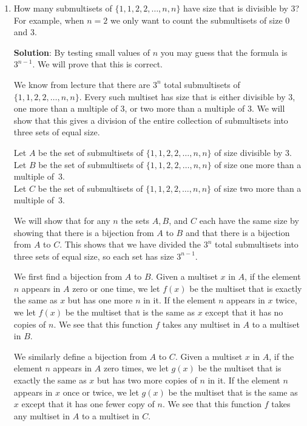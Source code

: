\documentclass[11pt]{article}
\begin{document}
\begin{enumerate}
\begin{enumerate}
{\bf Solution}: We must choose a team of $3$ centers, $4$ guards, and $5$ forwards, out of a total pool of $3\cdot 15 = 45$ centers, $4\cdot 15 = 60$ guards, and $5\cdot 15 = 75$ forwards.  The number of ways of doing this is $\binom{45}{3}\cdot \binom{60}{4} \cdot \binom{75}{5}$.

\end{enumerate}

\item How many submultisets of $\{1,1,2,2,\ldots, n, n\}$ have size that is divisible by $3$?  \\
For example, when $n = 2$ we only want to count the submultisets of size $0$ and $3$.

{\bf Solution}: By testing small values of $n$ you may guess that the formula is $3^{n-1}$.  We will prove that this is correct.

We know from lecture that there are $3^n$ total submultisets of $\{1,1,2,2,\ldots, n, n\}$.  Every such multiset has size that is either divisible by $3$, one more than a multiple of $3$, or two more than a multiple of $3$.  We will show that this gives a division of the entire collection of submultisets into three sets of equal size.  

Let $A$ be the set of submultisets of $\{1,1,2,2,\ldots,n,n\}$ of size divisible by $3$.\\
Let $B$ be the set of submultisets of $\{1,1,2,2,\ldots,n,n\}$ of size one more than a multiple of~$3$.\\
Let $C$ be the set of submultisets of $\{1,1,2,2,\ldots,n,n\}$ of size two more than a multiple of~$3$.

We will show that for any $n$ the sets $A,B$, and $C$ each have the same size by showing that there is a bijection from $A$ to $B$ and that there is a bijection from $A$ to $C$.  This shows that we have divided the $3^n$ total submultisets into three sets of equal size, so each set has size $3^{n-1}$.

We first find a bijection from $A$ to $B$.  Given a multiset $x$ in $A$, if the element $n$ appears in $A$ zero or one time, we let $f(x)$ be the multiset that is exactly the same as $x$ but has one more $n$ in it.  If the element $n$ appears in $x$ twice, we let $f(x)$ be the multiset that is the same as $x$ except that it has no copies of $n$.  We see that this function $f$ takes any multiset in $A$ to a multiset in $B$.

We similarly define a bijection from $A$ to $C$. Given a multiset $x$ in $A$, if the element $n$ appears in $A$ zero times, we let $g(x)$ be the multiset that is exactly the same as $x$ but has two more copies of $n$ in it.  If the element $n$ appears in $x$ once or twice, we let $g(x)$ be the multiset that is the same as $x$ except that it has one fewer copy of $n$.  We see that this function $f$ takes any multiset in $A$ to a multiset in $C$.


\end{enumerate}
\end{document}
